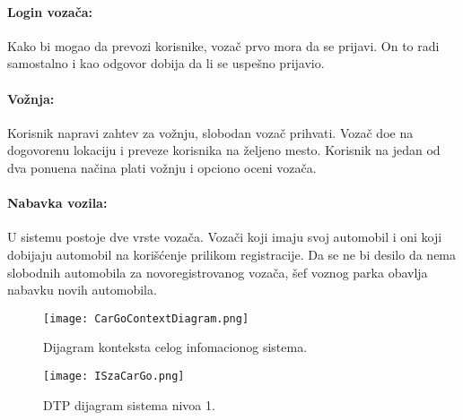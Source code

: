 \paragraph{Login voza\v ca:}
    Kako bi mogao da prevozi korisnike, voza\v c prvo mora da se prijavi. On to radi samostalno i kao odgovor dobija da li se uspe\v sno prijavio.
\paragraph{Vo\v znja:}
    Korisnik napravi zahtev za vo\v znju, slobodan voza\v c prihvati. Voza\v c do\dj e na dogovorenu lokaciju i preveze korisnika na \v zeljeno mesto. Korisnik na jedan od dva ponu\dj ena na\v cina plati vo\v znju i opciono oceni voza\v ca.
\paragraph{Nabavka vozila:}
    U sistemu postoje dve vrste voza\v ca. Voza\v ci koji imaju svoj automobil i oni koji dobijaju automobil na kori\v s\' cenje prilikom registracije. Da se ne bi desilo da nema slobodnih automobila za novoregistrovanog voza\v ca, \v sef voznog parka obavlja nabavku novih automobila.

\begin{figure}[H]
\begin{center}
\texttt{[image: CarGoContextDiagram.png]}
\end{center}
    \caption{Dijagram konteksta celog infomacionog sistema.}
\label{fig:contextDiagram}
\end{figure}

\begin{figure}[H]
\begin{center}
\texttt{[image: ISzaCarGo.png]}
\end{center}
    \caption{DTP dijagram sistema nivoa 1.}
\label{fig:dtp1}
\end{figure}

